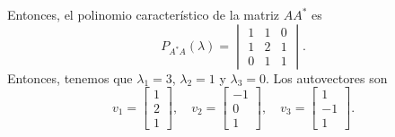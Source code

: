 \begin{frame}
\begin{solution}
		Entonces, el polinomio característico de la matriz $AA^{\ast}$ es
		\begin{equation*}
			P_{A^{\ast}A}
			\left(\lambda\right)=
			\begin{vmatrix}
				1 & 1 & 0 \\
				1 & 2 & 1 \\
				0 & 1 & 1
			\end{vmatrix}.%
		\end{equation*}
		Entonces, tenemos que $\lambda_{1}=3$, $\lambda_{2}=1$ y $\lambda_{3}=0$.
		Los autovectores son
		\begin{equation*}
			v_{1}=
			\begin{bmatrix}
				1 \\
				2 \\
				1
			\end{bmatrix},
			\quad
			v_{2}=
			\begin{bmatrix}
				-1 \\
				0  \\
				1
			\end{bmatrix},\quad
			v_{3}=
			\begin{bmatrix}
				1  \\
				-1 \\
				1
			\end{bmatrix}.
		\end{equation*}
	\end{solution}
\end{frame}

